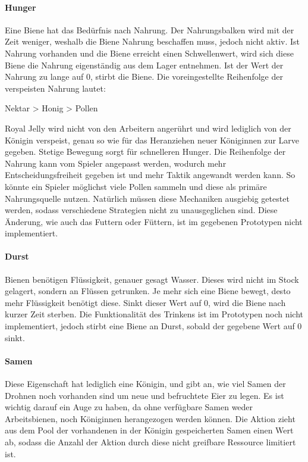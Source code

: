 \paragraph{Hunger} 
Eine Biene hat das Bedürfnis nach Nahrung. Der Nahrungsbalken wird mit der Zeit weniger, weshalb die Biene Nahrung beschaffen muss, jedoch nicht aktiv. Ist Nahrung vorhanden und die Biene erreicht einen Schwellenwert, wird sich diese Biene die Nahrung eigenständig aus dem Lager entnehmen. Ist der Wert der Nahrung zu lange auf 0, stirbt die Biene. Die voreingestellte Reihenfolge der verspeisten Nahrung lautet:

\begin{center}
    Nektar > Honig > Pollen
\end{center} Royal Jelly wird nicht von den Arbeitern angerührt und wird lediglich von der Königin verspeist, genau so wie für das Heranziehen neuer Königinnen zur Larve gegeben. Stetige Bewegung sorgt für schnelleren Hunger. Die Reihenfolge der Nahrung kann vom Spieler angepasst werden, wodurch mehr Entscheidungsfreiheit gegeben ist und mehr Taktik angewandt werden kann. So könnte ein Spieler möglichst viele Pollen sammeln und diese als primäre Nahrungsquelle nutzen. Natürlich müssen diese Mechaniken ausgiebig getestet werden, sodass verschiedene Strategien nicht zu unausgeglichen sind. Diese Änderung, wie auch das Futtern oder Füttern, ist im gegebenen Prototypen nicht implementiert.

\paragraph{Durst} 
Bienen benötigen Flüssigkeit, genauer gesagt Wasser. Dieses wird nicht im Stock gelagert, sondern an Flüssen getrunken. Je mehr sich eine Biene bewegt, desto mehr Flüssigkeit benötigt diese. Sinkt dieser Wert auf 0, wird die Biene nach kurzer Zeit sterben. Die Funktionalität des Trinkens ist im Prototypen noch nicht implementiert, jedoch stirbt eine Biene an Durst, sobald der gegebene Wert auf 0 sinkt.

\paragraph{Samen} 
Diese Eigenschaft hat lediglich eine Königin, und gibt an, wie viel Samen der Drohnen noch vorhanden sind um neue und befruchtete Eier zu legen. Es ist wichtig darauf ein Auge zu haben, da ohne verfügbare Samen weder Arbeitsbienen, noch Königinnen herangezogen werden können. Die Aktion zieht aus dem Pool der vorhandenen in der Königin gespeicherten Samen einen Wert ab, sodass die Anzahl der Aktion durch diese nicht greifbare Ressource limitiert ist.


